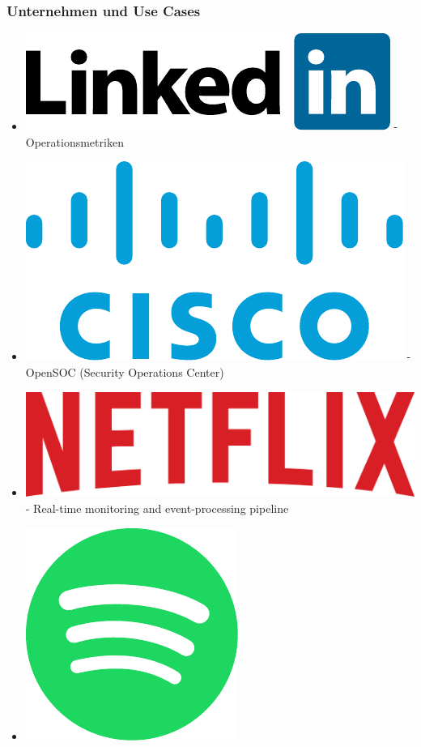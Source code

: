 \begin{frame}
\frametitle{Unternehmen und Use Cases}
\begin{itemize}
	\item \includegraphics[scale=0.2]{figure/linkedin_logo.pdf} 
		- Operationsmetriken
	\item \includegraphics[scale=0.2]{figure/cisco_logo.pdf} 
		- OpenSOC (Security Operations Center)
	\item \includegraphics[scale=0.08]{figure/netflix_logo.pdf} 
		- Real-time monitoring and event-processing pipeline
	\item \includegraphics[scale=0.2]{figure/spotify_logo.pdf} 

\end{itemize}
\end{frame}
